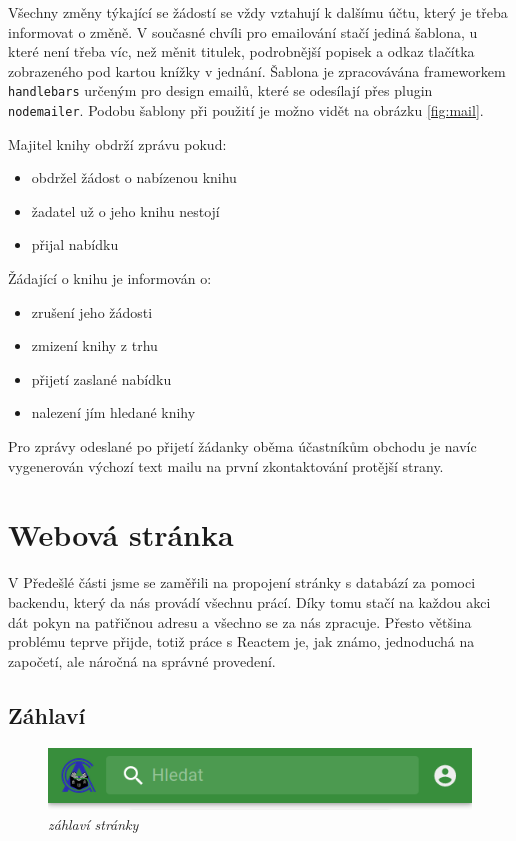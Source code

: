 \documentclass[a4paper,oneside,12pt]{report}
\begin{document}
Všechny změny týkající se žádostí se vždy vztahují k dalšímu účtu, který je třeba
informovat o\,\,změně. V současné chvíli pro emailování stačí jediná šablona, u které není
třeba víc, než měnit titulek, podrobnější popisek a odkaz tlačítka zobrazeného pod kartou
knížky v jednání. Šablona je zpracovávána frameworkem \texttt{handlebars} určeným pro
design emailů, které se odesílají přes plugin \texttt{nodemailer}. Podobu šablony při
použití je možno vidět na obrázku \ref{fig:mail}.

Majitel knihy obdrží zprávu pokud:
\begin{itemize}
	\setlength\itemsep{0em}
	\item obdržel žádost o nabízenou knihu
	\item žadatel už o jeho knihu nestojí
	\item přijal nabídku
\end{itemize}

\vspace{1em}
Žádající o knihu je informován o:
\begin{itemize}
	\setlength\itemsep{0em}
	\item zrušení jeho žádosti
	\item zmizení knihy z trhu
	\item přijetí zaslané nabídku
	\item nalezení jím hledané knihy
\end{itemize}

\vspace{1em}
Pro zprávy odeslané po přijetí žádanky oběma účastníkům obchodu je navíc vygenerován
výchozí text mailu na první zkontaktování protější strany.


\chapter{Webová stránka}
V Předešlé části jsme se zaměřili na propojení stránky s databází za pomoci backendu,
který da nás provádí všechnu prácí. Díky tomu stačí na každou akci dát pokyn na patřičnou
adresu a všechno se za nás zpracuje. Přesto většina problému teprve přijde, totiž práce s
Reactem je, jak známo, jednoduchá na započetí, ale náročná na správné provedení.

\section{Záhlaví}
\begin{figure}
	\vspace{-5mm}
	\centering
	\includegraphics{../img/Header.png}
	\vspace{-2mm}
	\caption{\textit{záhlaví stránky}}\label{fig:header}
\end{figure}
\end{document}
